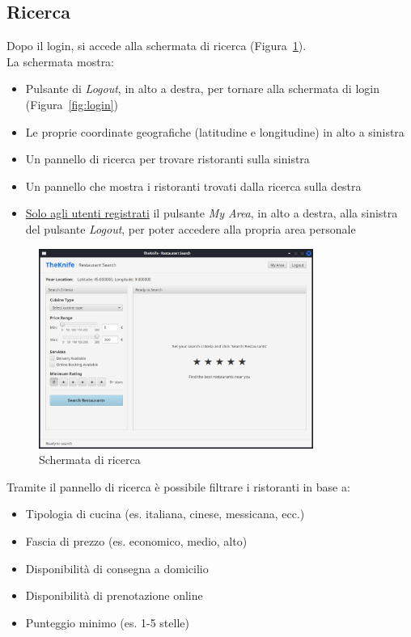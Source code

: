 \subsection{Ricerca}
Dopo il login, si accede alla schermata di ricerca (Figura~\ref{fig:search}).\\
La schermata mostra:
\begin{itemize}
    \item Pulsante di \emph{Logout}, in alto a destra, per tornare alla 
    schermata di login (Figura~\ref{fig:login})
    \item Le proprie coordinate geografiche 
    (latitudine e longitudine) in alto a sinistra
    \item Un pannello di ricerca per trovare ristoranti sulla sinistra
    \item Un pannello che mostra i ristoranti trovati dalla ricerca sulla destra
    \item \underline{Solo agli utenti registrati} il pulsante 
    \emph{My Area}, in alto a destra, alla sinistra del 
    pulsante \emph{Logout}, per poter accedere alla propria area personale
\end{itemize}
\begin{figure}[H]
    \centering
    \includegraphics[width=0.8\textwidth]{images/search.png}
    \caption{Schermata di ricerca}
    \label{fig:search}
\end{figure}
Tramite il pannello di ricerca è possibile 
filtrare i ristoranti in base a:
\begin{itemize}
    \item Tipologia di cucina (es. italiana, cinese, messicana, ecc.)
    \item Fascia di prezzo (es. economico, medio, alto)
    \item Disponibilità di consegna a domicilio
    \item Disponibilità di prenotazione online
    \item Punteggio minimo (es. 1-5 stelle)
\end{itemize}
